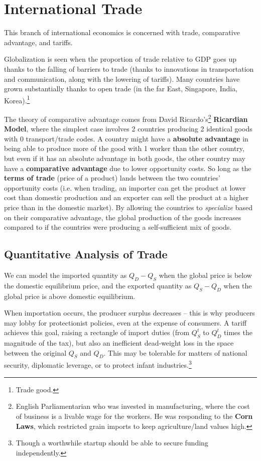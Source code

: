 \documentclass{article}
\begin{document}
\section{International Trade}
This branch of international economics is concerned with trade, comparative advantage, and tariffs.

Globalization is seen when the proportion of trade relative to GDP goes up thanks to the falling of barriers to trade (thanks to innovations in transportation and communication, along with the lowering of tariffs). Many countries have grown substantially thanks to open trade (in the far East, Singapore, India, Korea).\footnote{Trade good.}

The theory of comparative advantage comes from David Ricardo's\footnote{English Parliamentarian who was invested in manufacturing, where the cost of business is a livable wage for the workers. He was responding to the \textbf{Corn Laws}, which restricted grain imports to keep agriculture/land values high.} \textbf{Ricardian Model}, where the simplest case involves 2 countries producing 2 identical goods with 0 transport/trade codes. A country might have a \textbf{absolute advantage} in being able to produce more of the good with 1 worker than the other country, but even if it has an absolute advantage in both goods, the other country may have a \textbf{comparative advantage} due to lower opportunity costs. So long as the \textbf{terms of trade} (price of a product) lands between the two countries' opportunity costs (i.e. when trading, an importer can get the product at lower cost than domestic production and an exporter can sell the product at a higher price than in the domestic market). By allowing the countries to \textit{specialize} based on their comparative advantage, the global production of the goods increases compared to if the countries were producing a self-sufficient mix of goods.

\subsection{Quantitative Analysis of Trade}
We can model the imported quantity as $Q_D-Q_S$ when the global price is below the domestic equilibrium price, and the exported quantity as $Q_S-Q_D$ when the global price is above domestic equilibrium.

When importation occurs, the producer surplus decreases -- this is why producers may lobby for protectionist policies, even at the expense of consumers. A tariff achieves this goal, raising a rectangle of import duties (from $Q_S^t$ to $Q_D^t$ times the magnitude of the tax), but also an inefficient dead-weight loss in the space between the original $Q_S$ and $Q_D$. This may be tolerable for matters of national security, diplomatic leverage, or to protect infant industries.\footnote{Though a worthwhile startup should be able to secure funding independently.}
\end{document}

